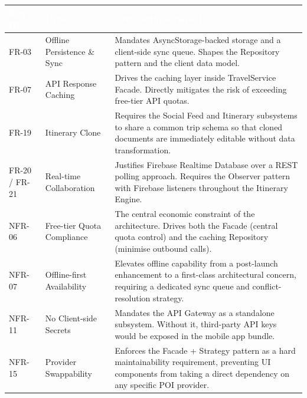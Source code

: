 \documentclass[12pt, a4paper]{article}
\newcommand{\reqid}[1]{\textsc{\small #1}}
\newcommand{\thcell}[1]{\textcolor{white}{\textbf{\small #1}}}
\begin{document}
\vspace{0.6em}
\begin{longtable}{C{1.8cm} L{4.5cm} L{7.4cm}}
\toprule
{}
\thcell{Req ID} & \thcell{Driver} & \thcell{Architectural Impact} \\
\midrule
\endhead
\bottomrule
\endfoot

\reqid{FR-03} & Offline Persistence \& Sync &
Mandates AsyncStorage-backed storage and a client-side sync queue. Shapes the Repository pattern and the client data model. \\

\reqid{FR-07} & API Response Caching &
Drives the caching layer inside TravelService Facade. Directly mitigates the risk of exceeding free-tier API quotas. \\

\reqid{FR-19} & Itinerary Clone &
Requires the Social Feed and Itinerary subsystems to share a common trip schema so that cloned documents are immediately editable without data transformation. \\

\reqid{FR-20 / FR-21} & Real-time Collaboration &
Justifies Firebase Realtime Database over a REST polling approach. Requires the Observer pattern with Firebase listeners throughout the Itinerary Engine. \\

\reqid{NFR-06} & Free-tier Quota Compliance &
The central economic constraint of the architecture. Drives both the Facade (central quota control) and the caching Repository (minimise outbound calls). \\

\reqid{NFR-07} & Offline-first Availability &
Elevates offline capability from a post-launch enhancement to a first-class architectural concern, requiring a dedicated sync queue and conflict-resolution strategy. \\

\reqid{NFR-11} & No Client-side Secrets &
Mandates the API Gateway as a standalone subsystem. Without it, third-party API keys would be exposed in the mobile app bundle. \\

\reqid{NFR-15} & Provider Swappability &
Enforces the Facade + Strategy pattern as a hard maintainability requirement, preventing UI components from taking a direct dependency on any specific POI provider. \\

\end{longtable}
\end{document}
